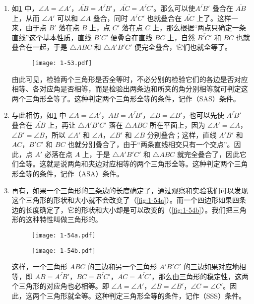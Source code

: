 \begin{enumerate}
	\item 如\cref{fig:1-53} 中，$\angle A=\angle A'$，$\overline{AB}=\overline{A'B'}$，$\overline{AC}=\overline{A'C'}$。那么可以使$\overline{A'B'}$ 叠合在 $\overline{AB}$ 上，从而 $\angle A'$ 可以和 $\angle A$ 叠合，同时 $\overline{A'C'}$ 也就叠合在 $\overline{AC}$ 上了。这样一来，由于点 $B'$ 落在点 $B$ 上，点 $C'$ 落在点 $C$ 上，那么根据“两点只确定一条直线”这个基本性质，直线 $B'C'$ 便叠合在直线 $BC$ 上，自然 $\overline{B'C'}$ 和 $\overline{BC}$ 也就叠合在一起，于是 $\triangle ABC$ 和 $\triangle A'B'C'$ 便完全叠合，它们也就全等了。
	\begin{figure}
		\texttt{[image: 1-53.pdf]}
		\caption{}\label{fig:1-53}
	\end{figure}

	由此可见，检验两个三角形是否全等时，不必分别的检验它们的各边是否对应相等、各对应角是否相等，而是检验出两条边和所夹的角分别相等就可判定这两个三角形全等了。这种判定两个三角形全等的条件，记作（SAS）条件。
	\item 与此相仿，如\cref{fig:1-53} 中 $\angle A=\angle A'$，$\overline{AB}=\overline{A'B'}$，$\angle B=\angle B'$，也可以先使 $\overline{A'B'}$ 叠合在 $\overline{AB}$ 上，再让 $\triangle A'B'C'$ 落在 $\triangle ABC$ 所在平面上，因为 $\angle A'=\angle A$，$\angle B'=\angle B$，所以 $\angle A'$ 和 $\angle A$，$\angle B'$ 和 $\angle B$ 分别叠合；这样，直线 $A'B'$ 和 $AC$，$B'C'$ 和 $BC$ 也就分别叠合了，由于“两条直线相交只有一个交点”。因此，点 $A'$ 必落在点 $A$ 上，于是 $\triangle A'B'C'$ 和 $\triangle ABC$ 就完全叠合了，因此它们全等。这就是说两角和夹边对应相等的两个三角形全等。这种判定两个三角形全等的条件，记作（ASA）条件。
	\item 再有，如果一个三角形的三条边的长度确定了，通过观察和实验我们可以发现这个三角形的形状和大小就不会改变了（\cref{fig:1-54a}）。而一个四边形如果四条边的长度确定了，它的形状和大小却是可以改变的（\cref{fig:1-54b}）。我们把三角形的这种特性叫做三角形的。
	\begin{figure}
		\begin{minipage}[b]{0.45\linewidth}\centering
			\texttt{[image: 1-54a.pdf]}
			\subcaption{}\label{fig:1-54a}
		\end{minipage}
		\begin{minipage}[b]{0.45\linewidth}\centering
			\texttt{[image: 1-54b.pdf]}
			\subcaption{}\label{fig:1-54b}
		\end{minipage}
		\caption{}\label{fig:1-54}
	\end{figure}

	这样，一个三角形 $ABC$ 的三边和另一个三角形 $A'B'C'$ 的三边如果对应地相等，即 $\overline{AB}=\overline{A'B'}$，$\overline{BC}=\overline{B'C'}$，$\overline{AC}=\overline{A'C'}$，那么由三角形的稳定性，这两个三角形的对应角也必相等。即 $\angle A=\angle A'$，$\angle B=\angle B'$，$\angle C=\angle C'$。因此，这两个三角形就全等。这种判定三角形全等的条件，记作（SSS）条件。
\end{enumerate}

